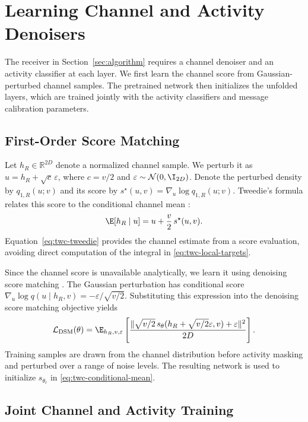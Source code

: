 \section{Learning Channel and Activity Denoisers}
\label{sec:learning}

The receiver in Section~\ref{sec:algorithm} requires a channel denoiser
and an activity classifier at each layer. We first learn the channel
score from Gaussian-perturbed channel samples. The pretrained network
then initializes the unfolded layers, which are trained jointly with
the activity classifiers and message calibration parameters.

\subsection{First-Order Score Matching}

Let $h_R\in\mathbb R^{2D}$ denote a normalized channel sample.
We perturb it as $u=h_R+\sqrt c\,\varepsilon$, where $c=v/2$
and $\varepsilon\sim\mathcal N(0,\I_{2D})$. Denote the perturbed
density by $q_{1,R}(u;v)$ and its score by
$s^\star(u,v)=\nabla_u\log q_{1,R}(u;v)$.
Tweedie's formula relates this score to the conditional channel mean
\cite{efron2011,cai2026}:
\begin{equation}
 \E[h_R\mid u]=u+\frac v2\,s^\star(u,v).
 \label{eq:twc-tweedie}
\end{equation}
Equation~\eqref{eq:twc-tweedie} provides the channel estimate from a
score evaluation, avoiding direct computation of the integral in
\eqref{eq:twc-local-targets}.

Since the channel score is unavailable analytically, we learn it
using denoising score matching \cite{vincent2011,song2019}.
The Gaussian perturbation has conditional score
$\nabla_u\log q(u\mid h_R,v)=-\varepsilon/\sqrt{v/2}$.
Substituting this expression into the denoising score matching
objective yields
\begin{equation}
 \mathcal L_{\rm DSM}(\theta)=\E_{h_R,v,\varepsilon}
 \left[\frac{\|\sqrt{v/2}\,s_\theta(h_R+\sqrt{v/2}\varepsilon,v)
                      +\varepsilon\|^2}{2D}\right].
 \label{eq:twc-dsm}
\end{equation}
Training samples are drawn from the channel distribution before
activity masking and perturbed over a range of noise levels.
The resulting network is used to initialize
$s_{\theta_\ell}$ in \eqref{eq:twc-conditional-mean}.

\subsection{Joint Channel and Activity Training}

